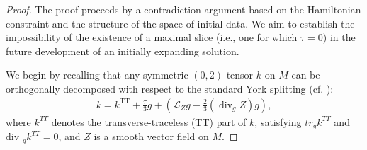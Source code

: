 \documentclass{amsart}
\renewcommand{\div}{\mbox{div }}
\begin{document}
\begin{proof}
The proof proceeds by a contradiction argument based on the Hamiltonian constraint and the structure of the space of initial data. We aim to establish the impossibility of the existence of a maximal slice (i.e., one for which $\tau=0$) in the future development of an initially expanding solution.

\noindent We begin by recalling that any symmetric $(0,2)$-tensor $k$ on $M$ can be orthogonally decomposed with respect to the standard York splitting (cf. \cite{koiso1979decomposition}):
\begin{align}
k = k^{\mathrm{TT}} + \frac{\tau}{3}g + \left( \mathscr{L}_Z g - \frac{2}{3} (\operatorname{div}_g Z) g \right),
\end{align}
where $k^{TT}$ denotes the transverse-traceless (TT) part of $k$, satisfying $tr_{g}k^{TT}$ and $\div_{g}k^{TT}=0$, and $Z$ is a smooth vector field on $M$.


\end{proof}
\end{document}
